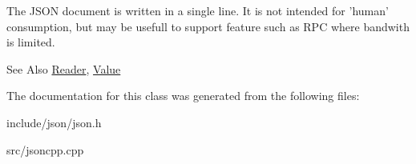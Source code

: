 The J\-S\-O\-N document is written in a single line. It is not intended for 'human' consumption, but may be usefull to support feature such as R\-P\-C where bandwith is limited. \begin{DoxySeeAlso}{See Also}
\hyperlink{class_json_1_1_reader}{Reader}, \hyperlink{class_json_1_1_value}{Value} 
\end{DoxySeeAlso}


The documentation for this class was generated from the following files\-:\begin{DoxyCompactItemize}
\item 
include/json/json.\-h\item 
src/jsoncpp.\-cpp\end{DoxyCompactItemize}
